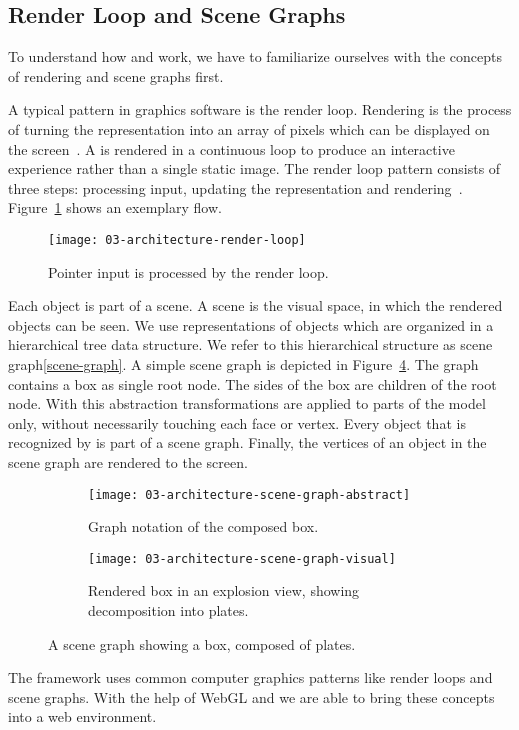 \documentclass[../../ClassicThesis.tex]{subfiles}
\begin{document}
\subsection{Render Loop and Scene Graphs}
\label{sub:render-and-graph}

To understand how {\convertify} and {\platener} work, we
have to familiarize ourselves with the concepts of rendering
and scene graphs first.

A typical pattern in graphics software is the render loop.
Rendering is the process of turning the {\threedmodel}
representation into an array of pixels which can be
displayed on the screen~\cite[p.~2]{intro-cg}. A
{\threedmodel} is rendered in a continuous loop to produce
an interactive experience rather than a single static image.
The render loop pattern consists of three steps: processing
input, updating the {\threedmodel} representation and
rendering~\cite{gamedev-gameloop}.
Figure~\ref{fig:render-loop} shows an exemplary flow.

\begin{figure}[h]
  \centering
  \texttt{[image: 03-architecture-render-loop]}
  \caption{Pointer input is processed by the render loop.}
  \label{fig:render-loop}
\end{figure}

Each object is part of a scene. A scene is the visual space,
in which the rendered objects can be seen. We use
representations of objects which are organized in a
hierarchical tree data structure. We refer to this
hierarchical structure as scene graph\ref{scene-graph}. A
simple scene graph is depicted in
Figure~\ref{fig:scene-graph}. The graph contains a box as
single root node. The sides of the box are children of the
root node. With this abstraction transformations are applied
to parts of the model only, without necessarily touching
each face or vertex. Every object that is recognized by
{\convertify} is part of a scene graph. Finally, the
vertices of an object in the scene graph are rendered to the
screen.

\begin{figure}[H]
  \centering
  \begin{subfigure}[b]{0.49\textwidth}
    \centering
    \texttt{[image: 03-architecture-scene-graph-abstract]}
    \caption{Graph notation of the composed box.}
    \label{fig:scene-graph:abstract}
  \end{subfigure}
  \begin{subfigure}[b]{0.49\textwidth}
    \centering
    \texttt{[image: 03-architecture-scene-graph-visual]}
    \caption{Rendered box in an explosion view, showing decomposition into plates.}
    \label{fig:scene-graph:visual}
  \end{subfigure}
  \caption{A scene graph showing a box, composed of plates.}
  \label{fig:scene-graph}
\end{figure}


The framework {\convertify} uses common computer graphics
patterns like render loops and scene graphs. With the help
of WebGL and {\threejs} we are able to bring these concepts
into a web environment.
\end{document}
